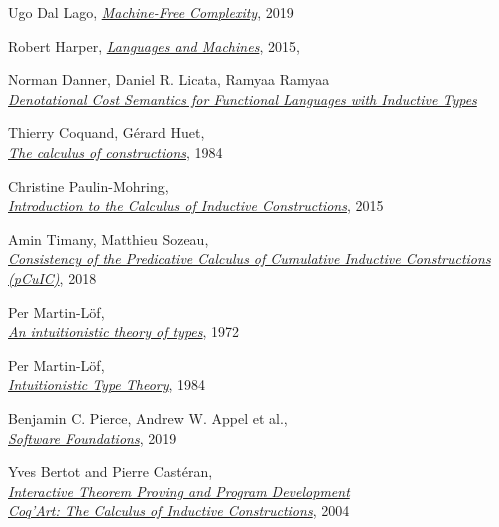 \documentclass[declaration,mgr,english,shortabstract]{iithesis}
\begin{document}
\begin{thebibliography}{1}
    Ugo Dal Lago,
    \href{https://caleidoscope.sciencesconf.org/data/DalLago_caleidoscopeslides.pdf}{\textit{Machine-Free Complexity}},
    2019

    Robert Harper,
    \href{https://existentialtype.wordpress.com/2011/03/16/languages-and-machines/}{\textit{Languages and Machines}}, 2015, \\

    Norman Danner, Daniel R. Licata, Ramyaa Ramyaa \\
    \href{https://dlicata.wescreates.wesleyan.edu/pubs/dlr15inductive/dlr15inductive.pdf}{\textit{Denotational Cost Semantics for Functional Languages with Inductive Types}}

    Thierry Coquand, Gérard Huet, \\
    \href{https://www.sciencedirect.com/science/article/pii/0890540188900053}{\textit{The calculus of constructions}}, 1984

    Christine Paulin-Mohring, \\
    \href{https://hal.inria.fr/hal-01094195/document}{\textit{Introduction to the Calculus of Inductive Constructions}}, 2015

    Amin Timany, Matthieu Sozeau, \\
    \href{https://hal.inria.fr/hal-01615123v2/document}{\textit{Consistency of the Predicative Calculus of Cumulative Inductive Constructions (pCuIC)}}, 2018

    Per Martin-L\"{o}f, \\
    \href{https://archive-pml.github.io/martin-lof/pdfs/An-Intuitionistic-Theory-of-Types-1972.pdf}{\textit{An intuitionistic theory of types}}, 1972

    Per Martin-L\"{o}f, \\
    \href{https://archive-pml.github.io/martin-lof/pdfs/Bibliopolis-Book-retypeset-1984.pdf}{\textit{Intuitionistic Type Theory}}, 1984
    
    Benjamin C. Pierce, Andrew W. Appel et al., \\
    \href{https://softwarefoundations.cis.upenn.edu/}{\textit{Software Foundations}}, 2019

    Yves Bertot and Pierre Castéran, \\
    \href{https://www.labri.fr/perso/casteran/CoqArt/}{\textit{Interactive Theorem Proving and Program Development \\ Coq'Art: The Calculus of Inductive Constructions}}, 2004


\end{thebibliography}
\end{document}
